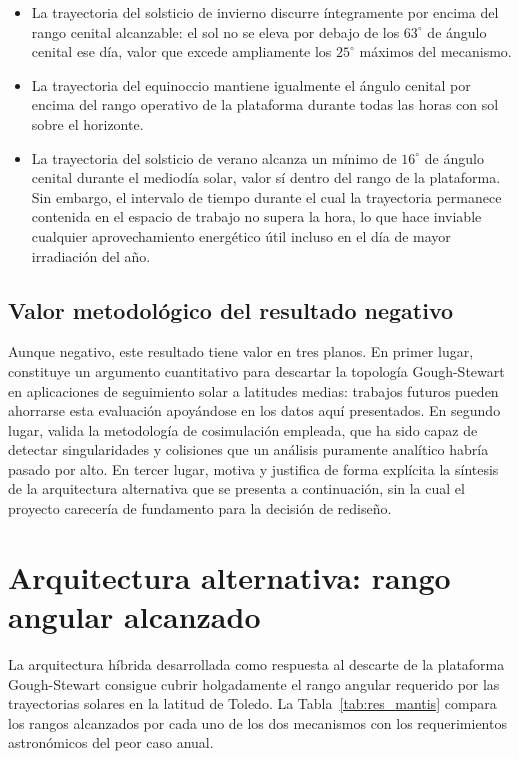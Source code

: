 \begin{itemize}
	\item La trayectoria del solsticio de invierno discurre 
    íntegramente por encima del rango cenital alcanzable: el sol no 
    se eleva por debajo de los $63^{\circ}$ de ángulo cenital ese día, 
    valor que excede ampliamente los $25^{\circ}$ máximos del 
    mecanismo.
    
	\item La trayectoria del equinoccio mantiene 
    igualmente el ángulo cenital por encima del rango operativo de la 
    plataforma durante todas las horas con sol sobre el horizonte.    
    
    \item La trayectoria del solsticio de verano alcanza un 
    mínimo de $16^{\circ}$ de ángulo cenital durante el mediodía 
    solar, valor sí dentro del rango de la plataforma. Sin embargo, 
    el intervalo de tiempo durante el cual la trayectoria permanece 
    contenida en el espacio de trabajo no supera la hora, lo que 
    hace inviable cualquier aprovechamiento energético útil incluso 
    en el día de mayor irradiación del año.
\end{itemize}

\subsection{Valor metodológico del resultado negativo}
Aunque negativo, este resultado tiene valor en tres planos. En primer lugar, constituye un argumento cuantitativo para descartar la topología Gough-Stewart en aplicaciones de seguimiento solar a latitudes medias: trabajos futuros pueden ahorrarse esta evaluación apoyándose en los datos aquí presentados. En segundo lugar, valida la metodología de cosimulación empleada, que ha sido capaz de detectar singularidades y colisiones que un análisis puramente analítico habría pasado por alto. En tercer lugar, motiva y justifica de forma explícita la síntesis de la arquitectura alternativa que se presenta a continuación, sin la cual el proyecto carecería de fundamento para la decisión de rediseño.

\section{Arquitectura alternativa: rango angular alcanzado}
\label{sec:res_mantis}

La arquitectura híbrida desarrollada como respuesta al descarte de la plataforma Gough-Stewart consigue cubrir holgadamente el rango angular requerido por las trayectorias solares en la latitud de Toledo. La Tabla~\ref{tab:res_mantis} compara los rangos alcanzados por cada uno de los dos mecanismos con los requerimientos astronómicos del peor caso anual.

